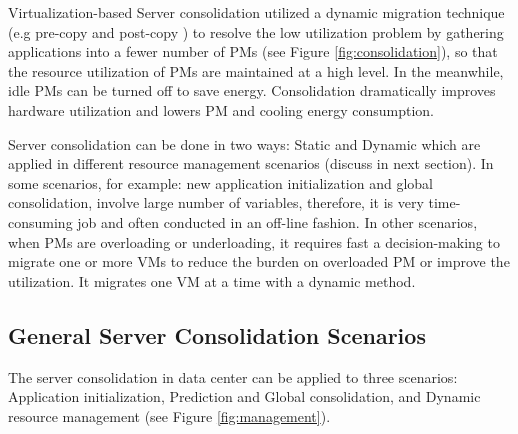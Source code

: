 Virtualization-based Server consolidation \cite{Zhang:2010vo} utilized a dynamic migration technique (e.g pre-copy \cite{Clark:2005ud} and post-copy \cite{Hines:2009fv}) to resolve the low utilization problem by gathering applications into a fewer number of PMs (see Figure \ref{fig:consolidation}), so that the resource utilization of PMs are maintained at a high level. In the meanwhile, idle PMs can be turned off to save energy. Consolidation dramatically improves hardware utilization and lowers PM and cooling energy consumption. 

Server consolidation can be done in two ways: Static and Dynamic \cite{Xiao:2015ik, Verma:2009wi} which are applied in different resource management scenarios (discuss in next section). In some scenarios, for example: new application initialization and global consolidation, involve large number of variables, therefore, it is very time-consuming job and often conducted in an off-line fashion. In other scenarios, when PMs are overloading or underloading, it requires fast a decision-making to migrate one or more VMs to reduce the burden on overloaded PM or improve the utilization. It migrates one VM at a time with a dynamic method. 



\subsection{General Server Consolidation Scenarios}

The server consolidation in data center can be applied to three \cite{Svard:2015ic, Mishra:2012kx} scenarios: Application initialization, Prediction and Global consolidation, and Dynamic resource management (see Figure \ref{fig:management}). 

